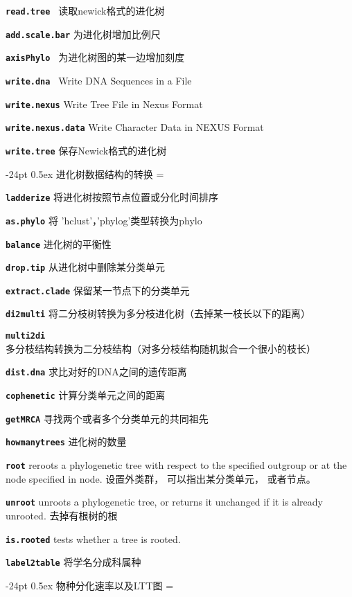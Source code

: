 \documentclass[10pt,landscape]{article}
\makeatletter
\renewcommand\section{\@startsection{section}{1}{0mm}%
                                     {-24pt}%
                                     {0.5ex}%
                                {\color{blue}\normalfont\large\bfseries}}
\newcommand{\bcode}[1]{\texttt{\textbf{#1}}}
\makeatother
\begin{document}
\begin{CJK}{UTF8}{gbsn}
\begin{multicols}{3}
\bcode{read.tree         }   读取newick格式的进化树

\bcode{add.scale.bar} 为进化树增加比例尺

\bcode{axisPhylo    } 为进化树图的某一边增加刻度

\bcode{write.dna }  Write DNA Sequences in a File

\bcode{write.nexus} Write Tree File in Nexus Format

\bcode{write.nexus.data}    Write Character Data in NEXUS Format

\bcode{write.tree} 保存Newick格式的进化树


\section{进化树数据结构的转换}
\everypar={\hangindent=9mm}

\bcode{ladderize} 将进化树按照节点位置或分化时间排序

\bcode{as.phylo}  将 'hclust'，'phylog'类型转换为phylo

\bcode{balance} 进化树的平衡性

\bcode{drop.tip} 从进化树中删除某分类单元

\bcode{extract.clade} 保留某一节点下的分类单元

\bcode{di2multi} 将二分枝树转换为多分枝进化树（去掉某一枝长以下的距离）

\bcode{multi2di} 多分枝结构转换为二分枝结构（对多分枝结构随机拟合一个很小的枝长）

\bcode{dist.dna} 求比对好的DNA之间的遗传距离

\bcode{cophenetic} 计算分类单元之间的距离

\bcode{getMRCA} 寻找两个或者多个分类单元的共同祖先

\bcode{howmanytrees} 进化树的数量

\bcode{root} reroots a phylogenetic tree with respect to the specified outgroup or at the node specified in node. 设置外类群， 可以指出某分类单元， 或者节点。

\bcode{unroot} unroots a phylogenetic tree, or returns it unchanged if it is already unrooted. 去掉有根树的根

\bcode{is.rooted} tests whether a tree is rooted. 

\bcode{label2table} 将学名分成科属种

\section{物种分化速率以及LTT图}
\everypar={\hangindent=9mm}


\end{multicols}
\end{CJK}
\end{document}
